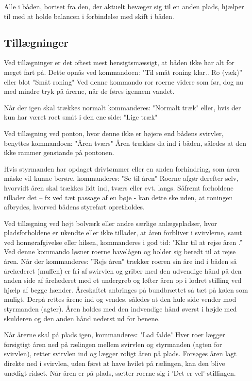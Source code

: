 \documentclass{article}
\begin{document}
Alle i båden, bortset fra den, der aktuelt bevæger sig til en anden
plads, hjælper til med at holde balancen i forbindelse med skift i båden.

\subsection{Tillægninger}

Ved tillægninger er det oftest mest hensigtsmæssigt, at båden ikke har
alt for meget fart på. Dette opnås ved kommandoen: "Til småt roning
klar.. Ro (væk)” eller blot "Småt roning" Ved denne kommando ror roerne
videre som før, dog nu med mindre tryk på årerne, når de føres igennem
vandet.

Når der igen skal trækkes normalt kommanderes: "Normalt træk" eller, hvis
der kun har været roet småt i den ene side: "Lige træk"

Ved tillægning ved ponton, hvor denne ikke er højere end bådens svirvler,
benyttes kommandoen: "Åren tværs" Åren trækkes da ind i båden, således at
den ikke rammer genstande på pontonen.

Hvis styrmanden har opdaget drivtømmer eller en anden forhindring, som
åren måske vil kunne berøre, kommanderes: "Se til åren" Roerne afgør
derefter selv, hvorvidt åren skal trækkes lidt ind, tværs eller evt.
langs. Såfremt forholdene tillader det – fx ved tæt passage af en bøje -
kan dette ske uden, at roningen afbrydes, hvorved bådens styrefart
opretholdes.

Ved tillægning ved højt bolværk eller andre særlige anlægspladser, hvor
pladsforholdene er ukendte eller ikke tillader, at åren forbliver i
svirvlerne, samt ved honnørafgivelse eller hilsen, kommanderes i god tid:
"Klar til at rejse åren .” Ved denne kommando løsner roerne havelågen og
holder sig beredt til at rejse åren. Når der kommanderes: ”Rejs åren"
trækker roeren sin åre ind i båden så årelæderet (muffen) er fri af
swirvlen og griber med den udvendige hånd på den anden side af årelæderet
med et undergreb og løfter åren op i lodret stilling ved hjælp af begge
hænder. Åreskaftet anbringes på bundbrættet så tæt på kølen som muligt.
Derpå rettes årene ind og vendes, således at den hule side vender mod
styrmanden (agter). Åren holdes med den indvendige hånd øverst i højde
med skulderen og den anden hånd nederst ud for benene.

Når årerne skal på plads igen, kommanderes: "Lad falde" Hver roer lægger
forsigtigt åren ned på rælingen mellem svirvlen og styrmanden (agten for
svirvlen), retter svirvlen ind og lægger roligt åren på plads. Forsøges
åren lagt direkte ned i svirvlen, uden først at have hvilet på rælingen,
kan den blive unødigt ridset. Når åren er på plads, sætter roerne sig i
’Det er vel’-stillingen.
\end{document}
